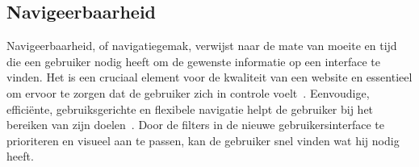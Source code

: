 \subsection{Navigeerbaarheid}
Navigeerbaarheid, of navigatiegemak, verwijst naar de mate van moeite en tijd die een gebruiker nodig heeft om de gewenste informatie op een interface te vinden. Het is een cruciaal element voor de kwaliteit van een website en essentieel om ervoor te zorgen dat de gebruiker zich in controle voelt~\autocite{Zachrison2022}. Eenvoudige, efficiënte, gebruiksgerichte en flexibele navigatie helpt de gebruiker bij het bereiken van zijn doelen~\autocite{Pearson2007}. Door de filters in de nieuwe gebruikersinterface te prioriteren en visueel aan te passen, kan de gebruiker snel vinden wat hij nodig heeft.



%
%
%

